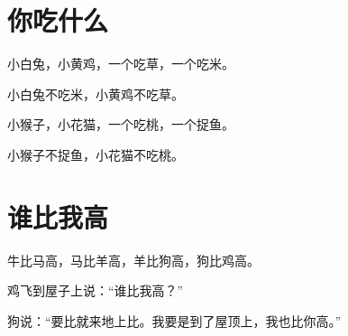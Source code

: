 \documentclass[12pt,UTF-8,openany]{ctexbook}
\begin{document}
\hanzibox{}\hanzibox{}\hanzibox{}\hanzibox{}\hspace{1em}\hanzibox{}\hanzibox{}\hanzibox{}\hanzibox{}






\chapter{你吃什么}

\begin{large}
    
    小白兔，小黄鸡，一个吃草，一个吃米。
    
    小白兔不吃米，小黄鸡不吃草。
    
    小猴子，小花猫，一个吃桃，一个捉鱼。
    
    小猴子不捉鱼，小花猫不吃桃。
    
\end{large}


\clearpage

\begin{center}
    
\end{center}


\hanzibox{}\hanzibox{}\hanzibox{}\hanzibox{}\hspace{1em}\hanzibox{}\hanzibox{}\hanzibox{}\hanzibox{}

\hanzibox{}\hanzibox{}\hanzibox{}\hanzibox{}\hspace{1em}\hanzibox{}\hanzibox{}\hanzibox{}\hanzibox{}

\hanzibox{}\hanzibox{}\hanzibox{}\hanzibox{}\hspace{1em}




\chapter{谁比我高}

\begin{large}
    
    牛比马高，马比羊高，羊比狗高，狗比鸡高。
    
    鸡飞到屋子上说：“谁比我高？”
    
    狗说：“要比就来地上比。我要是到了屋顶上，我也比你高。”
    
\end{large}
\end{document}
